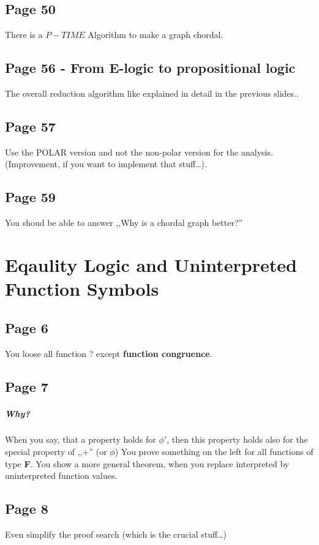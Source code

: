 \documentclass[a4paper]{article}
\begin{document}
\subsection{Page 50}
There is a $P-TIME$ Algorithm to make a graph chordal.


\subsection{Page 56 - From E-logic to propositional logic}

The overall reduction algorithm like explained in detail in the previous
slides..


\subsection{Page 57}
Use the POLAR version and not the non-polar version for the analysis.
(Improvement, if you want to implement that stuff\ldots).


\subsection{Page 59}

You shoud be able to answer ,,Why is a chordal graph better?''




\section{Eqaulity Logic and Uninterpreted Function Symbols}

\subsection{Page 6}
You loose all function ? except \textbf{function congruence}.

\subsection{Page 7}

\subparagraph{Why?} When you say, that a property holds for $\phi'$, then this
property holds also for the special property of ,,$+$'' (or $\phi$)
You prove something on the left for all functions of type \textbf{F}. You show a
more general theorem, when you replace interpreted by uninterpreted function
values.


\subsection{Page 8}
Even simplify the proof search (which is the crucial stuff\ldots)
\end{document}
